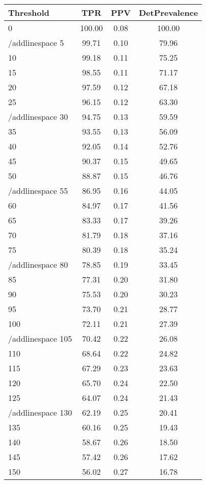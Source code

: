 \begin{table}[ht]
\centering
\begin{tabular}{lccc}
  \toprule
Threshold & TPR & PPV & DetPrevalence \\ 
  \midrule
0 & 100.00 & 0.08 & 100.00 \\ 
   /addlinespace
5 & 99.71 & 0.10 & 79.96 \\ 
  10 & 99.18 & 0.11 & 75.25 \\ 
  15 & 98.55 & 0.11 & 71.17 \\ 
  20 & 97.59 & 0.12 & 67.18 \\ 
  25 & 96.15 & 0.12 & 63.30 \\ 
   /addlinespace
30 & 94.75 & 0.13 & 59.59 \\ 
  35 & 93.55 & 0.13 & 56.09 \\ 
  40 & 92.05 & 0.14 & 52.76 \\ 
  45 & 90.37 & 0.15 & 49.65 \\ 
  50 & 88.87 & 0.15 & 46.76 \\ 
   /addlinespace
55 & 86.95 & 0.16 & 44.05 \\ 
  60 & 84.97 & 0.17 & 41.56 \\ 
  65 & 83.33 & 0.17 & 39.26 \\ 
  70 & 81.79 & 0.18 & 37.16 \\ 
  75 & 80.39 & 0.18 & 35.24 \\ 
   /addlinespace
80 & 78.85 & 0.19 & 33.45 \\ 
  85 & 77.31 & 0.20 & 31.80 \\ 
  90 & 75.53 & 0.20 & 30.23 \\ 
  95 & 73.70 & 0.21 & 28.77 \\ 
  100 & 72.11 & 0.21 & 27.39 \\ 
   /addlinespace
105 & 70.42 & 0.22 & 26.08 \\ 
  110 & 68.64 & 0.22 & 24.82 \\ 
  115 & 67.29 & 0.23 & 23.63 \\ 
  120 & 65.70 & 0.24 & 22.50 \\ 
  125 & 64.07 & 0.24 & 21.43 \\ 
   /addlinespace
130 & 62.19 & 0.25 & 20.41 \\ 
  135 & 60.16 & 0.25 & 19.43 \\ 
  140 & 58.67 & 0.26 & 18.50 \\ 
  145 & 57.42 & 0.26 & 17.62 \\ 
  150 & 56.02 & 0.27 & 16.78 \\ 

\end{tabular}
\end{table}

